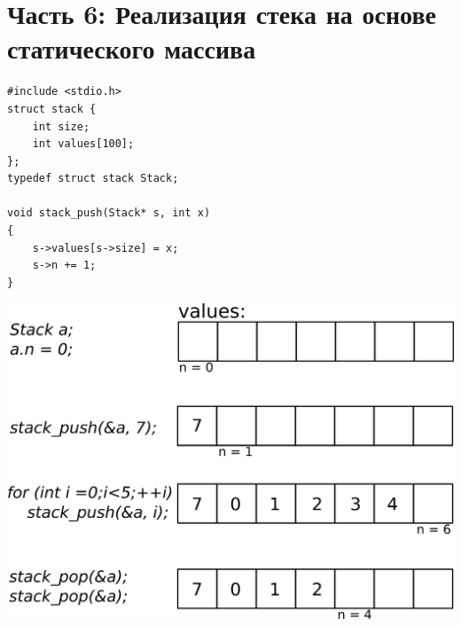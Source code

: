 \documentclass{article}
\begin{document}
\section*{Часть 6: Реализация стека на основе статического массива}
\begin{multicols}{2}
\begin{lstlisting}
#include <stdio.h>
struct stack {
    int size;
    int values[100];
};
typedef struct stack Stack;

void stack_push(Stack* s, int x)
{
    s->values[s->size] = x;
    s->n += 1;
}
\end{lstlisting}

\begin{center}
\includegraphics[width=0.95\linewidth]{../images/stack.png}
\end{center}
\end{multicols}
\end{document}
